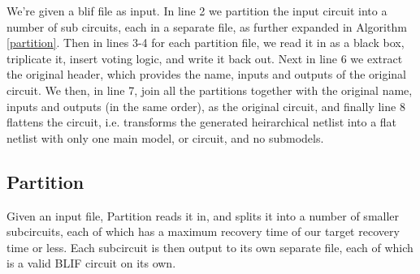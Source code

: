 \documentclass[12pt,final,oneside]{dwThesis} %
\begin{document}
   We're given a blif file as input.  In line 2 we partition
   the input circuit into a number of sub circuits, each in a separate file, as
   further expanded in Algorithm \ref{partition}.  Then in lines 3-4 for each
   partition file, we read it in as a black box, triplicate it, insert voting
   logic, and write it back out.  Next in line 6 we extract the original
   header, which provides the name, inputs and outputs of the original circuit.
   We then, in line 7, join all the partitions together with the original name,
   inputs and outputs (in the same order), as the original circuit, and finally
   line 8 flattens the circuit, i.e. transforms the generated heirarchical
   netlist into a flat netlist with only one main model, or circuit, and no
   submodels.

   \newpage 
   \subsection{Partition}
   \label{algPartition} Given an input file,
   Partition reads it in, and splits it into a number of smaller subcircuits,
   each of which has a maximum recovery time of our target recovery time or
   less. Each subcircuit is then output to its own separate file, each of which
   is a valid \gls{BLIF} circuit on its own.  
\end{document}
